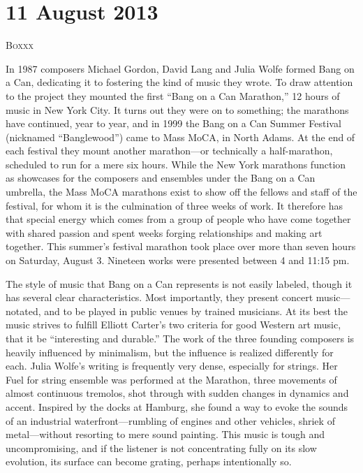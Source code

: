 
\chapter{11 August 2013}

\textsc{Boxxx}

In 1987 composers Michael Gordon, David Lang and Julia Wolfe formed Bang on a Can, dedicating it to fostering the kind of music they wrote. To draw attention to the project they mounted the first “Bang on a Can Marathon,” 12 hours of music in New York City. It turns out they were on to something; the marathons have continued, year to year, and in 1999 the Bang on a Can Summer Festival (nicknamed “Banglewood”) came to Mass MoCA, in North Adams. At the end of each festival they mount another marathon—or technically a half-marathon, scheduled to run for a mere six hours. While the New York marathons function as showcases for the composers and ensembles under the Bang on a Can umbrella, the Mass MoCA marathons exist to show off the fellows and staff of the festival, for whom it is the culmination of three weeks of work. It therefore has that special energy which comes from a group of people who have come together with shared passion and spent weeks forging relationships and making art together. This summer’s festival marathon took place over more than seven hours on Saturday, August 3. Nineteen works were presented between 4 and 11:15 pm.

The style of music that Bang on a Can represents is not easily labeled, though it has several clear characteristics. Most importantly, they present concert music—notated, and to be played in public venues by trained musicians. At its best the music strives to fulfill Elliott Carter’s two criteria for good Western art music, that it be “interesting and durable.” The work of the three founding composers is heavily influenced by minimalism, but the influence is realized differently for each. Julia Wolfe’s writing is frequently very dense, especially for strings. Her Fuel for string ensemble was performed at the Marathon, three movements of almost continuous tremolos, shot through with sudden changes in dynamics and accent. Inspired by the docks at Hamburg, she found a way to evoke the sounds of an industrial waterfront—rumbling of engines and other vehicles, shriek of metal—without resorting to mere sound painting. This music is tough and uncompromising, and if the listener is not concentrating fully on its slow evolution, its surface can become grating, perhaps intentionally so.

